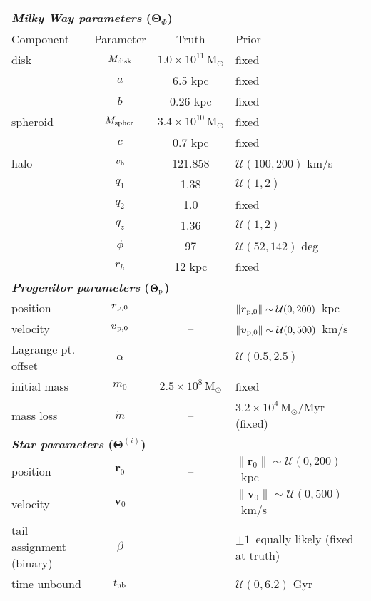 \documentclass[letterpaper,12pt,preprint]{aastex}
\newcommand{\msun}{\mathrm{M}_\odot}
\newcommand{\bs}{\boldsymbol}
\newcommand{\sat}{{\rm p}}
\newcommand{\tub}{t_{\rm ub}}
\newcommand{\vhalo}{v_{\rm h}}
\begin{document}
\begin{table}[h]
\begin{center}
	\begin{tabular}{l c c l} \toprule
		\multicolumn{4}{l}{{\bf \emph{Milky Way parameters} ($\bs{\Theta}_\Phi$)}} \\
		\toprule
		Component & Parameter & Truth & Prior \\\toprule
		disk & $M_{\rm disk}$ & $1.0\times10^{11}\,\msun$ & fixed \\ 
		& $a$ & 6.5 kpc & fixed\\
		& $b$ & 0.26 kpc & fixed\\
		\midrule
		spheroid & $M_{\rm spher}$ & $3.4\times10^{10}\,\msun$ & fixed\\ 
		& $c$ & 0.7 kpc & fixed\\
		\midrule
		halo & $\vhalo$ & 121.858 & $\mathcal{U}(100,200)$ km/s \\
		& $q_1$ & 1.38 & $\mathcal{U}(1,2)$\\
		& $q_2$ & 1.0 & fixed\\
		& $q_z$ & 1.36 & $\mathcal{U}(1,2)$\\
		& $\phi$ & 97 & $\mathcal{U}(52,142)$ deg\\
		& $r_h$ & 12 kpc & fixed\\
		\toprule
		\multicolumn{4}{l}{{\bf \emph{Progenitor parameters} ($\bs{\Theta}_\sat$)}} \\
		\toprule
		position & $\bs{r}_{\sat,0}$ & -- & $\|\bs{r}_{\sat,0}\|\sim\mathcal{U}(0,200)$~kpc \\
		velocity & $\bs{v}_{\sat,0}$ & -- & $\|\bs{v}_{\sat,0}\|\sim\mathcal{U}(0,500)$~km/s\\
		Lagrange pt. offset & $\alpha$ & -- & $\mathcal{U}(0.5, 2.5)$\\
		initial mass & $m_0$ & $2.5\times10^8\,\msun$ & fixed\\
		mass loss & $\dot{m}$ & -- & $3.2\times10^4\,\msun$/Myr (fixed)\\
		\toprule
		\multicolumn{4}{l}{{\bf \emph{Star parameters} ($\bs{\Theta}^{(i)}$)}} \\
		\toprule
		position & $\bs{r}_0$ & -- & $\|\bs{r}_0\|\sim\mathcal{U}(0,200)$~kpc \\
		velocity & $\bs{v}_0$ & -- & $\|\bs{v}_0\|\sim\mathcal{U}(0,500)$~km/s\\
		tail assignment (binary) & $\beta$ & -- & $\pm1$~equally likely (fixed at truth)\\ 
		time unbound & $\tub$ & -- & $\mathcal{U}(0,6.2)$ Gyr\\ 

\end{tabular}
\end{center}
\end{table}
\end{document}

